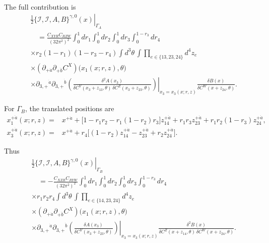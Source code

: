 \documentclass[11pt]{article}
\numberwithin{equation}{section}
\numberwithin{figure}{section}
\numberwithin{table}{section}
\begin{document}
The full contribution is
\begin{equation}\label{eq-product2A}
\begin{aligned}
&\left.\frac12\{\mathcal I,\mathcal I,A,B\}^{\gamma,0}(x)\right|_{\Gamma_A}\\
&\quad=\frac{C_{XYR}C_{RZW}}{(32\pi^2)^2}
\int_0^1dr_1\int_0^1dr_2\int_0^1dr_3\int_0^{1-r_3}dr_4\\
&\times r_2(1-r_1)(1-r_3-r_4)
\int d^3\theta\,
\int\prod_{e\in\{13,23,24\}}d^4z_e\\
&\times(\partial_{+\dot a}\partial_{+\dot b}C^X)
\big(x_1(x;r,z),\theta\big)\\
&\times\left.
\partial_{3,+}{}^{\dot a}\partial_{3,+}{}^{\dot b}
\left(
\frac{\delta^2 A(x_3)}{
\delta C^Y(x_3+z_{13},\theta)\,
\delta C^Z(x_3+z_{23},\theta)}
\right)\right|_{x_3=x_3(x;r,z)}
\frac{\delta B(x)}{\delta C^W(x+z_{24},\theta)}.
\end{aligned}
\end{equation}

For $\Gamma_B$, the translated positions are
\begin{equation*}
\begin{aligned}
x_1^{+\dot a}(x;r,z)
={}&x^{+\dot a}+\big[1-r_1r_2-r_1(1-r_2)r_3\big]z_{14}^{+\dot a}
+r_1r_3z_{23}^{+\dot a}
+r_1r_2(1-r_3)z_{24}^{+\dot a},\\
x_3^{+\dot a}(x;r,z)
={}&x^{+\dot a}+r_4\big[(1-r_2)z_{14}^{+\dot a}-z_{23}^{+\dot a}
+r_2z_{24}^{+\dot a}\big].
\end{aligned}
\end{equation*}

Thus
\begin{equation}\label{eq-product2B}
\begin{aligned}
&\left.\frac12\{\mathcal I,\mathcal I,A,B\}^{\gamma,0}(x)\right|_{\Gamma_B}\\
&\quad=-\frac{C_{XZR}C_{RYW}}{(32\pi^2)^2}
\int_0^1dr_1\int_0^1dr_2\int_0^1dr_3\int_0^{1-r_3}dr_4\\
&\times r_1r_2r_4\int d^3\theta\,
\int\prod_{e\in\{14,23,24\}}d^4z_e\\
&\times(\partial_{+\dot a}\partial_{+\dot b}C^X)
\big(x_1(x;r,z),\theta\big)\\
&\times\left.
\partial_{3,+}{}^{\dot a}\partial_{3,+}{}^{\dot b}
\left(\frac{\delta A(x_3)}{\delta C^Y(x_3+z_{23},\theta)}\right)
\right|_{x_3=x_3(x;r,z)}
\frac{\delta^2 B(x)}{
\delta C^Z(x+z_{14},\theta)\,\delta C^W(x+z_{24},\theta)}.
\end{aligned}
\end{equation}
\end{document}
